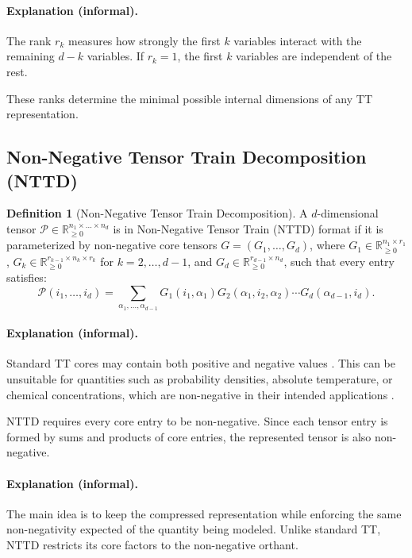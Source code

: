 \documentclass[11pt,a4paper,parskip=half-]{scrartcl}
\theoremstyle{definition}
\newtheorem{definition}{Definition}[section]
\theoremstyle{plain}
\theoremstyle{remark}
\begin{document}
\paragraph{Explanation (informal).}
The rank $r_k$ measures how strongly the first $k$ variables interact with the
remaining $d - k$ variables. If $r_k = 1$, the first $k$ variables are
independent of the rest.

These ranks determine the minimal possible internal dimensions of any TT
representation.

\subsection{Non-Negative Tensor Train Decomposition (NTTD)}
\label{sec:nttd_definition}

\begin{definition}[Non-Negative Tensor Train Decomposition]
A $d$-dimensional tensor $\mathcal{P} \in \mathbb{R}_{\ge 0}^{n_1 \times \dots \times n_d}$ is in
Non-Negative Tensor Train (NTTD) format if it is parameterized by non-negative core tensors $G = (G_1, \dots, G_d)$, 
where $G_1 \in \mathbb{R}_{\ge 0}^{n_1 \times r_1}$, $G_k \in \mathbb{R}_{\ge 0}^{r_{k-1} \times n_k \times r_k}$ for $k = 2, \dots, d-1$, 
and $G_d \in \mathbb{R}_{\ge 0}^{r_{d-1} \times n_d}$, such that every entry satisfies:
\begin{equation}
\mathcal{P}(i_1, \dots, i_d) = \sum_{\alpha_1, \dots, \alpha_{d-1}} G_1(i_1, \alpha_1) G_2(\alpha_1, i_2, \alpha_2) \cdots G_d(\alpha_{d-1}, i_d).
\end{equation}
\end{definition}

\paragraph{Explanation (informal).}
Standard TT cores may contain both positive and negative values \cite{tang2026density}.
This can be unsuitable for quantities such as probability densities, absolute
temperature, or chemical concentrations, which are non-negative in their
intended applications \cite{bhattarai2020distributed}.

NTTD requires every core entry to be non-negative. Since each tensor entry is
formed by sums and products of core entries, the represented tensor is also
non-negative.

\paragraph{Explanation (informal).}
The main idea is to keep the compressed representation while enforcing the
same non-negativity expected of the quantity being modeled. Unlike standard
TT, NTTD restricts its core factors to the non-negative orthant.
\end{document}
